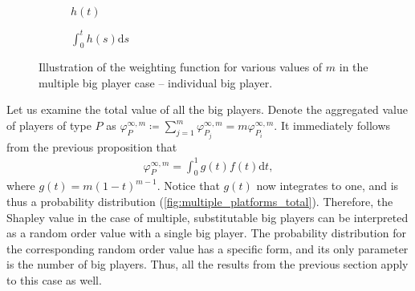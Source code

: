 \documentclass[a4paper]{article}
\newcommand{\dt}{\mathrm{d}t}
\newcommand{\ds}{\mathrm{d}s}
\begin{document}
\begin{figure}[ht]
    \centering
    \begin{subfigure}[b]{0.45\textwidth}
        \centering
        \caption{$h(t)$}
    \end{subfigure}
    \begin{subfigure}[b]{0.45\textwidth}
        \centering
        \caption{$\int_0^t h(s) \ds$}
    \end{subfigure}
    \caption{Illustration of the weighting function for various values of $m$ in the multiple big player case -- individual big player.}
    \label{fig:multiple_platforms}
\end{figure}

Let us examine the total value of all the big players.
Denote the aggregated value of players of type $P$ as $\varphi_{P}^{\infty, m} \coloneqq \sum_{j=1}^m\varphi_{P_j}^{\infty, m} = m\varphi_{P_i}^{\infty, m}$.
It immediately follows from the previous proposition that
\begin{align*}
    \varphi_{P}^{\infty, m} = \int_0^1 g(t) f(t) \dt,
\end{align*}
where $g(t) = m (1-t) ^ {m-1}$.
Notice that $g(t)$ now integrates to one, and is thus a probability distribution (\cref{fig:multiple_platforms_total}).
Therefore, the Shapley value in the case of multiple, substitutable big players can be interpreted as a random order value with a single big player.
The probability distribution for the corresponding random order value has a specific form, and its only parameter is the number of big players.
Thus, all the results from the previous section apply to this case as well.
\end{document}
